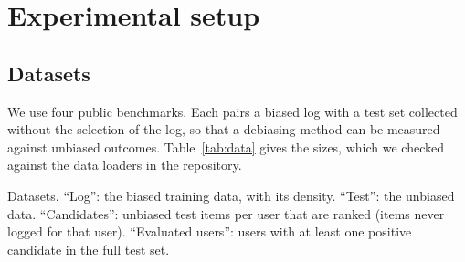 \sloppy
\section{Experimental setup}\label{sec:setup}

\subsection{Datasets}\label{sec:datasets}

We use four public benchmarks. Each pairs a biased log with a test set collected without the
selection of the log, so that a debiasing method can be measured against unbiased outcomes.
Table~\ref{tab:data} gives the sizes, which we checked against the data loaders in the repository.

\begin{table}[t]\centering\scriptsize
\caption{Datasets. ``Log'': the biased training data, with its density. ``Test'': the unbiased
data. ``Candidates'': unbiased test items per user that are ranked (items never logged for that
user). ``Evaluated users'': users with at least one positive candidate in the full test set.}\label{tab:data}
\begin{adjustbox}{max width=\textwidth}

\end{adjustbox}
\end{table}

